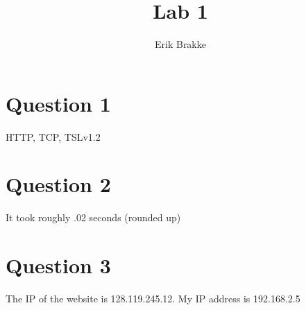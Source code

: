 \documentclass[11pt]{article}
\theoremstyle{definition}
\begin{document}
\title{Lab 1}
\author{Erik Brakke}
\maketitle

\thispagestyle{fancy}
 
 
\section*{Question 1}
HTTP, TCP, TSLv1.2

\section*{Question 2}
It took roughly .02 seconds (rounded up)

\section*{Question 3}
The IP of the website is 128.119.245.12.  My IP address is 192.168.2.5
\end{document}

